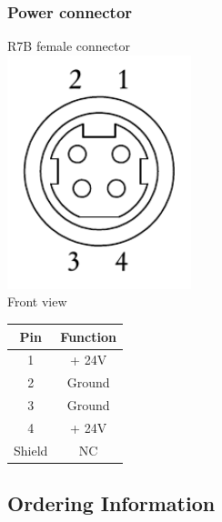 \documentclass[a4paper, final, 12pt, oneside]{scrartcl}
\numberwithin{equation}{section}
\numberwithin{table}{section}
\numberwithin{figure}{section}
\begin{document}
\subsubsection*{Power connector}
\begin{minipage}{\textwidth}
  \begin{minipage}[h]{0.49\textwidth}
    \centering
    R7B female connector\\
    \includegraphics[width=0.4\textwidth]{./drawings/R7B.pdf}\\
    Front view
  \end{minipage}
  \hfill
  \begin{minipage}[h]{0.49\textwidth}
    \centering
    \begin{tabular}{cc}
      \toprule
      \textbf{Pin} & \textbf{Function} \\
      \toprule
      1 & + 24V \\ \midrule
      2 & Ground\\ \midrule
      3 & Ground \\ \midrule
      4 & + 24V  \\ \midrule
      Shield & NC \\
      \bottomrule
    \end{tabular}
  \end{minipage}
\end{minipage}
\FloatBarrier

\subsection*{Ordering Information}
\end{document}
